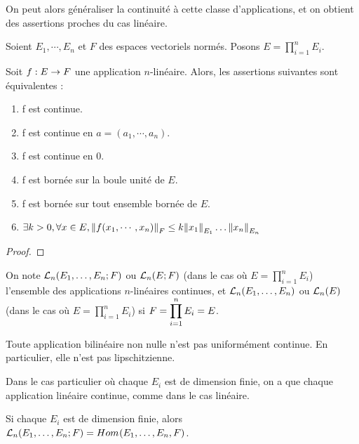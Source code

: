 On peut alors généraliser la continuité à cette classe d'applications, et on
obtient des assertions proches du cas linéaire.

\begin{proposition}
	Soient $E_{1}, \cdots, E_{n}$ et $F$ des espaces vectoriels normés. Posons
	$E = \displaystyle \prod_{i = 1}^{n} E_{i}$.

	Soit $\GSfunction{f}{E}{F}$ une application $n$-linéaire.
	Alors, les assertions suivantes sont équivalentes :

	\begin{enumerate}
		\item f est continue.
		\item f est continue en $a = (a_{1}, \cdots, a_{n})$.
		\item f est continue en $0$.
		\item f est bornée sur la boule unité de $E$.
		\item f est bornée sur tout ensemble bornée de $E$.
		\item $\exists k > 0, \forall x \in E, \GSnormeDef{f(x_{1}, \cdots,
			x_{n})}{F} \leq k \GSnormeDef{x_{1}}{E_{1}} \ldots
			\GSnormeDef{x_{n}}{E_{n}}$
	\end{enumerate}
\end{proposition}

\ifdefined\outputproof
\begin{proof}

\end{proof}
\fi

On note $\GScontinueHomo[n]{E_{1}, \ldots, E_{n}}{F}$ ou
$\GScontinueHomo[n]{E}{F}$ (dans le cas où $E = \prod_{i = 1}^{n} E_{i}$) l'ensemble des applications
$n$-linéaires continues, et $\GScontinueEndo[n]{E_{1}, \ldots, E_{n}}$ ou
$\GScontinueEndo[n]{E}$ (dans le cas où $E = \prod_{i = 1}^{n} E_{i}$) si $F =
\GSprodSet{i}{1}{n}{E} = E$.

\begin{remarque}
	Toute application bilinéaire non nulle n'est pas uniformément continue. En
	particulier, elle n'est pas lipschitzienne.
\end{remarque}

Dans le cas particulier où chaque $E_{i}$ est de dimension finie, on a que
chaque application linéaire continue, comme dans le cas linéaire.

\begin{proposition}
	Si chaque $E_{i}$ est de dimension finie, alors $\GScontinueHomo[n]{E_{1},
	\ldots, E_{n}}{F} = \GShomomorphisme{E_{1}, \ldots, E_{n}}{F}$.
\end{proposition}

